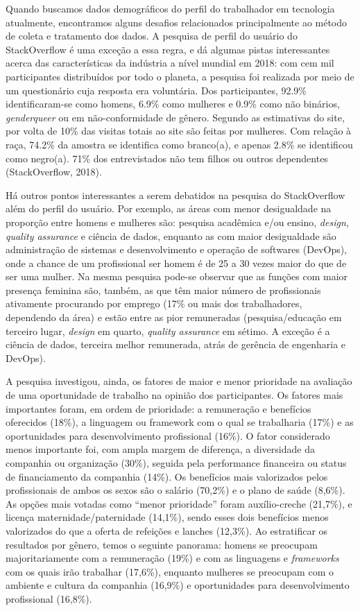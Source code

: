 Quando buscamos dados demográficos do perfil do trabalhador em tecnologia atualmente, encontramos alguns desafios relacionados principalmente ao método de coleta e tratamento dos dados. A pesquisa de perfil do usuário do StackOverflow é uma exceção a essa regra, e dá algumas pistas interessantes acerca das características da indústria a nível mundial em 2018: com cem mil participantes distribuídos por todo o planeta, a pesquisa foi realizada por meio de um questionário cuja resposta era voluntária. Dos participantes, 92.9\% identificaram-se como homens, 6.9\% como mulheres e 0.9\% como não binários, \textit{genderqueer} ou em não-conformidade de gênero. Segundo as estimativas do site, por volta de 10\% das visitas totais ao site são feitas por mulheres. Com relação à raça, 74.2\% da amostra se identifica como branco(a), e apenas 2.8\% se identificou como negro(a). 71\% dos entrevistados não tem filhos ou outros dependentes (StackOverflow, 2018).

Há outros pontos interessantes a serem debatidos na pesquisa do StackOverflow além do perfil do usuário. Por exemplo, as áreas com menor desigualdade na proporção entre homens e mulheres são: pesquisa acadêmica e/ou ensino, \textit{design, quality assurance} e ciência de dados, enquanto as com maior desigualdade são administração de sistemas e desenvolvimento e operação de softwares (DevOps), onde a chance de um profissional ser homem é de 25 a 30 vezes maior do que de ser uma mulher. Na mesma pesquisa pode-se observar que as funções com maior presença feminina são, também, as que têm maior número de profissionais ativamente procurando por emprego (17\% ou mais dos trabalhadores, dependendo da área) e estão entre as pior remuneradas (pesquisa/educação em terceiro lugar, \textit{design} em quarto, \textit{quality assurance} em sétimo. A exceção é a ciência de dados, terceira melhor remunerada, atrás de gerência de engenharia e DevOps).

A pesquisa investigou, ainda, os fatores de maior e menor prioridade na avaliação de uma oportunidade de trabalho na opinião dos participantes. Os fatores mais importantes foram, em ordem de prioridade: a remuneração e benefícios oferecidos (18\%), a linguagem ou framework com o qual se trabalharia (17\%) e as oportunidades para desenvolvimento profissional (16\%). O fator considerado menos importante foi, com ampla margem de diferença, a diversidade da companhia ou organização (30\%), seguida pela performance financeira ou status de financiamento da companhia (14\%). Os benefícios mais valorizados pelos profissionais de ambos os sexos são o salário (70,2\%) e o plano de saúde (8,6\%). As opções mais votadas como “menor prioridade” foram auxílio-creche (21,7\%), e licença maternidade/paternidade (14,1\%), sendo esses dois benefícios menos valorizados do que a oferta de refeições e lanches (12,3\%). Ao estratificar os resultados por gênero, temos o seguinte panorama: homens se preocupam majoritariamente com a remuneração (19\%) e com as linguagens e \textit{frameworks} com os quais irão trabalhar (17,6\%), enquanto mulheres se preocupam com o ambiente e cultura da companhia (16,9\%) e oportunidades para desenvolvimento profissional (16,8\%). 

